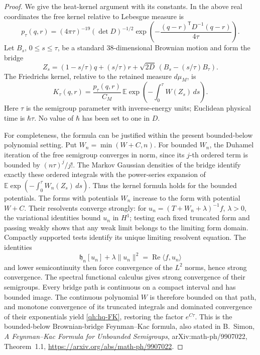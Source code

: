 \begin{proof}
We give the heat-kernel argument with its constants. In the above real
coordinates the free kernel relative to Lebesgue measure is
\[
 p_\tau(q,r)=(4\pi\tau)^{-19}(\det D)^{-1/2}
        \exp\!\left(-\frac{(q-r)^{\mathsf T}D^{-1}(q-r)}{4\tau}\right).
\]
Let \(B_s\), \(0\leq s\leq\tau\), be a standard 38-dimensional
Brownian motion and form the bridge
\[
 Z_s=(1-s/\tau)q+(s/\tau)r
                   +\sqrt{2D}\,(B_s-(s/\tau)B_\tau).
\]
The Friedrichs kernel, relative to the retained measure \(d\mu_M\), is
\begin{equation}\label{qh:hq-FK}
 K_\tau(q,r)=\frac{p_\tau(q,r)}{C_M}\,
       \mathbb E\exp\!\left(-\int_0^\tau W(Z_s)\,ds\right).
\end{equation}
Here \(\tau\) is the semigroup parameter with inverse-energy units;
Euclidean physical time is \(\hbar\tau\). No value of \(\hbar\)
has been set to one in \(D\).

For completeness, the formula can be justified within the present
bounded-below polynomial setting. Put
\(W_n=\min(W+C,n)\). For bounded \(W_n\), the Duhamel iteration of
the free semigroup converges in norm, since its \(j\)-th ordered
term is bounded by \((n\tau)^j/j!\). The Markov Gaussian densities
of the bridge identify exactly these ordered integrals with the
power-series expansion of
\(\mathbb E\exp(-\int_0^\tau W_n(Z_s)\,ds)\).
Thus the kernel formula holds for the bounded potentials.
The forms with potentials \(W_n\) increase to the form with
potential \(W+C\). Their resolvents converge strongly: for
\(u_n=(T+W_n+\lambda)^{-1}f\), \(\lambda>0\), the variational
identities bound \(u_n\) in \(H^1\); testing each fixed truncated
form and passing weakly shows that any weak limit belongs to
the limiting form domain. Compactly supported tests identify
its unique limiting resolvent equation. The identities
\[
 \mathfrak h_n[u_n]+\lambda\|u_n\|^2
       =\operatorname{Re}\langle f,u_n\rangle
\]
and lower semicontinuity then force convergence of the \(L^2\)
norms, hence strong convergence. The spectral functional calculus
gives strong convergence of their semigroups.
Every bridge path is continuous on a compact interval and has
bounded image. The continuous polynomial \(W\) is therefore
bounded on that path, and monotone convergence of its truncated
integrals and dominated convergence of their exponentials yield
\eqref{qh:hq-FK}, restoring the factor \(e^{C\tau}\).
This is the bounded-below Brownian-bridge Feynman--Kac formula,
also stated in B.~Simon, \emph{A Feynman--Kac Formula for Unbounded
Semigroups}, arXiv:math-ph/9907022, Theorem~1.1,
\url{https://arxiv.org/abs/math-ph/9907022}.


\end{proof}
